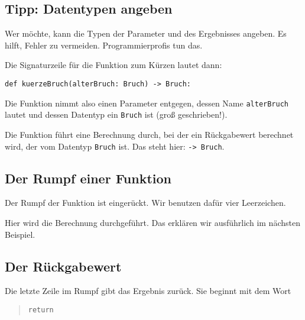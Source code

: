 \subsection*{Tipp: Datentypen angeben}

Wer möchte, kann die Typen der Parameter und des Ergebnisses angeben. Es hilft, Fehler zu vermeiden. Programmierprofis tun das.

Die Signaturzeile für die Funktion zum Kürzen lautet dann:

\lstset{style=syntaxPython}
\begin{lstlisting}
def kuerzeBruch(alterBruch: Bruch) -> Bruch:
\end{lstlisting}

Die Funktion nimmt also einen Parameter entgegen, dessen Name \texttt{alterBruch} lautet und dessen Datentyp ein \texttt{Bruch} ist (groß geschrieben!).

Die Funktion führt eine Berechnung durch, bei der ein Rückgabewert berechnet wird, der vom Datentyp \texttt{Bruch} ist. Das steht hier: \texttt{-> Bruch}.

\subsection*{Der Rumpf einer Funktion}

Der Rumpf der Funktion ist eingerückt. Wir benutzen dafür vier Leerzeichen.

Hier wird die Berechnung durchgeführt. Das erklären wir ausführlich im nächsten Beispiel.


\subsection*{Der Rückgabewert}

Die letzte Zeile im Rumpf gibt das Ergebnis zurück. Sie beginnt mit dem Wort
\begin{quote}
\texttt{return}
\end{quote}

